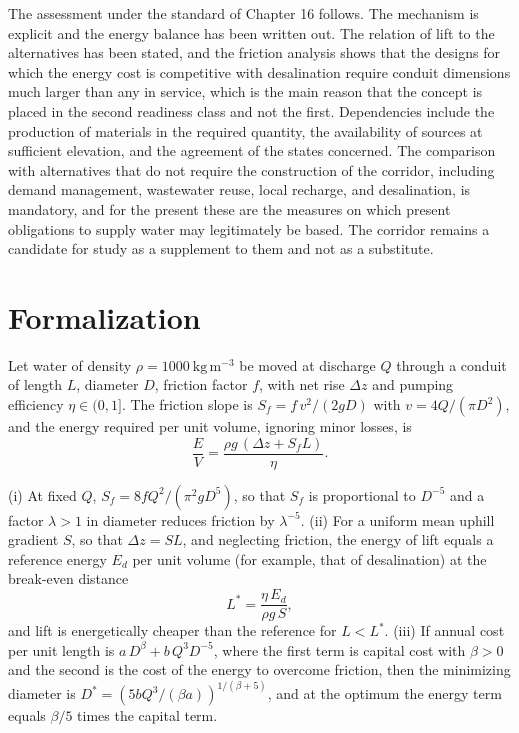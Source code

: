 The assessment under the standard of Chapter 16 follows. The mechanism is explicit and the energy balance has been written out. The relation of lift to the alternatives has been stated, and the friction analysis shows that the designs for which the energy cost is competitive with desalination require conduit dimensions much larger than any in service, which is the main reason that the concept is placed in the second readiness class and not the first. Dependencies include the production of materials in the required quantity, the availability of sources at sufficient elevation, and the agreement of the states concerned. The comparison with alternatives that do not require the construction of the corridor, including demand management, wastewater reuse, local recharge, and desalination, is mandatory, and for the present these are the measures on which present obligations to supply water may legitimately be based. The corridor remains a candidate for study as a supplement to them and not as a substitute.

\section*{Formalization}

Let water of density $\rho=1000\ \mathrm{kg\,m^{-3}}$ be moved at discharge $Q$ through a conduit of length $L$, diameter $D$, friction factor $f$, with net rise $\Delta z$ and pumping efficiency $\eta\in(0,1]$. The friction slope is $S_f=f\,v^2/(2gD)$ with $v=4Q/(\pi D^2)$, and the energy required per unit volume, ignoring minor losses, is
\[
\frac{E}{V}=\frac{\rho g\,(\Delta z+S_fL)}{\eta}.
\]

\begin{proposition}
(i) At fixed $Q$, $S_f=8fQ^2/(\pi^2gD^5)$, so that $S_f$ is proportional to $D^{-5}$ and a factor $\lambda>1$ in diameter reduces friction by $\lambda^{-5}$. (ii) For a uniform mean uphill gradient $S$, so that $\Delta z=SL$, and neglecting friction, the energy of lift equals a reference energy $E_d$ per unit volume (for example, that of desalination) at the break-even distance
\[
L^\ast=\frac{\eta\,E_d}{\rho g\,S},
\]
and lift is energetically cheaper than the reference for $L<L^\ast$. (iii) If annual cost per unit length is $a\,D^\beta+b\,Q^3D^{-5}$, where the first term is capital cost with $\beta>0$ and the second is the cost of the energy to overcome friction, then the minimizing diameter is $D^\ast=(5bQ^3/(\beta a))^{1/(\beta+5)}$, and at the optimum the energy term equals $\beta/5$ times the capital term.
\end{proposition}

